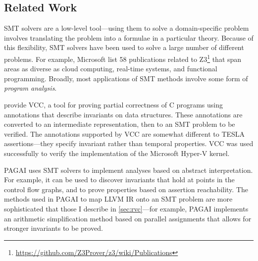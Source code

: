 \subsection{Related Work}

SMT solvers are a low-level tool---using them to solve a domain-specific problem
involves translating the problem into a formulae in a particular theory. Because
of this flexibility, SMT solvers have been used to solve a large number of
different problems. For example, Microsoft list 58 publications related to
Z3\footnote{\url{https://github.com/Z3Prover/z3/wiki/Publications}} that span
areas as diverse as cloud computing, real-time systems, and functional
programming. Broadly, most applications of SMT methods involve some form of
\emph{program analysis}.

\textcite{dahlweid_vcc:_2009} provide VCC, a tool for proving partial
correctness of C programs using annotations that describe invariants on data
structures. These annotations are converted to an intermediate representation,
then to an SMT problem to be verified. The annotations supported by VCC are
somewhat different to TESLA assertions---they specify invariant rather than
temporal properties. VCC was used successfully to verify the implementation of
the Microsoft Hyper-V kernel.

% 


PAGAI \cite{henry_pagai:_2012} uses SMT solvers to implement analyses based on
abstract interpretation. For example, it can be used to discover invariants that
hold at points in the control flow graphs, and to prove properties based on
assertion reachability. The methods used in PAGAI to map LLVM IR onto an SMT
problem are more sophisticated that those I describe in \autoref{sec:rvc}---for
example, PAGAI implements an arithmetic simplification method based on parallel
assignments that allows for stronger invariants to be proved.
